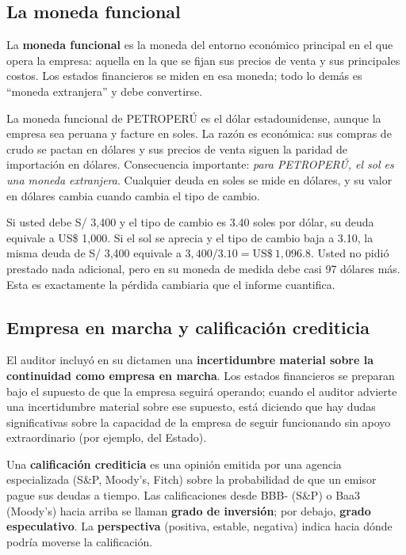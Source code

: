 \subsection{La moneda funcional}

\begin{definicion}
La \textbf{moneda funcional} es la moneda del entorno económico principal en el que opera la empresa: aquella en la que se fijan sus precios de venta y sus principales costos. Los estados financieros se miden en esa moneda; todo lo demás es \enquote{moneda extranjera} y debe convertirse.
\end{definicion}

La moneda funcional de PETROPERÚ es el dólar estadounidense, aunque la empresa sea peruana y facture en soles. La razón es económica: sus compras de crudo se pactan en dólares y sus precios de venta siguen la paridad de importación en dólares. Consecuencia importante: \emph{para PETROPERÚ, el sol es una moneda extranjera}. Cualquier deuda en soles se mide en dólares, y su valor en dólares cambia cuando cambia el tipo de cambio.

\begin{intuicion}
Si usted debe S/ 3,400 y el tipo de cambio es 3.40 soles por dólar, su deuda equivale a US\$ 1,000. Si el sol se aprecia y el tipo de cambio baja a 3.10, la misma deuda de S/ 3,400 equivale a $3{,}400/3.10=\text{US\$}~1{,}096.8$. Usted no pidió prestado nada adicional, pero en su moneda de medida debe casi 97 dólares más. Esta es exactamente la pérdida cambiaria que el informe cuantifica.
\end{intuicion}

\subsection{Empresa en marcha y calificación crediticia}

El auditor incluyó en su dictamen una \textbf{incertidumbre material sobre la continuidad como empresa en marcha}. Los estados financieros se preparan bajo el supuesto de que la empresa seguirá operando; cuando el auditor advierte una incertidumbre material sobre ese supuesto, está diciendo que hay dudas significativas sobre la capacidad de la empresa de seguir funcionando sin apoyo extraordinario (por ejemplo, del Estado).

\begin{definicion}
Una \textbf{calificación crediticia} es una opinión emitida por una agencia especializada (S\&P, Moody's, Fitch) sobre la probabilidad de que un emisor pague sus deudas a tiempo. Las calificaciones desde BBB- (S\&P) o Baa3 (Moody's) hacia arriba se llaman \textbf{grado de inversión}; por debajo, \textbf{grado especulativo}. La \textbf{perspectiva} (positiva, estable, negativa) indica hacia dónde podría moverse la calificación.
\end{definicion}

